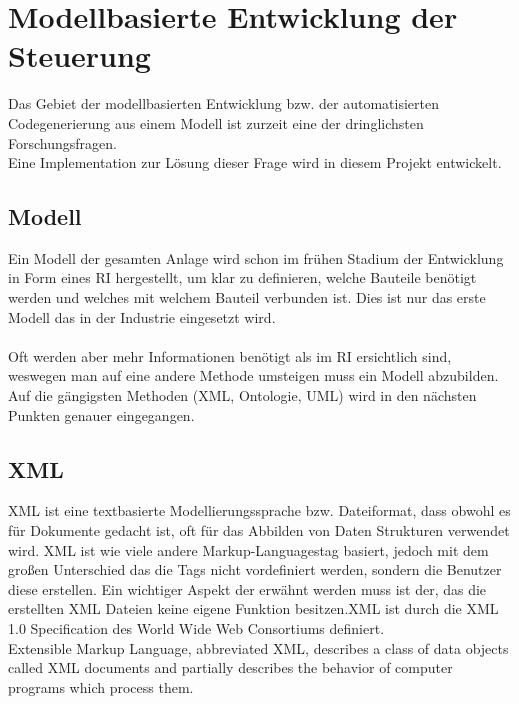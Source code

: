 \section{Modellbasierte Entwicklung der Steuerung} \label{modellbasierte_entwicklung}
Das Gebiet der modellbasierten Entwicklung bzw. der automatisierten Codegenerierung aus einem Modell ist zurzeit eine der dringlichsten Forschungsfragen.\\
Eine Implementation zur Lösung dieser Frage wird in diesem Projekt entwickelt.
\subsection{Modell}
Ein Modell der gesamten Anlage wird schon im frühen Stadium der Entwicklung in Form eines \ac{RI} hergestellt, um klar zu definieren, welche Bauteile benötigt werden und welches mit welchem Bauteil verbunden ist. Dies ist nur das erste Modell das in der Industrie eingesetzt wird.\\
\\
Oft werden aber mehr Informationen benötigt als im \ac{RI} ersichtlich sind, weswegen man auf eine andere Methode umsteigen muss ein Modell abzubilden.\\
Auf die gängigsten Methoden (\ac{XML}, Ontologie, \ac{UML}) wird in den nächsten Punkten genauer eingegangen.
\subsection{\ac{XML}}
\ac{XML} ist eine textbasierte Modellierungssprache bzw. Dateiformat, dass obwohl es für Dokumente gedacht ist, oft für das Abbilden von Daten Strukturen verwendet wird. \ac{XML} ist wie viele andere \glqq Markup-Languages\grqq\space tag basiert, jedoch mit dem großen Unterschied das die Tags nicht vordefiniert werden, sondern die Benutzer diese erstellen. Ein wichtiger Aspekt der erwähnt werden muss ist der, das die erstellten \ac{XML} Dateien keine eigene Funktion besitzen.\ac{XML} ist durch die XML 1.0 Specification des World Wide Web Consortiums definiert.\\
\glqq Extensible Markup Language, abbreviated XML, describes a class of data objects called XML documents and partially describes the behavior of computer programs which process them.\grqq \cite{xml_ref}



